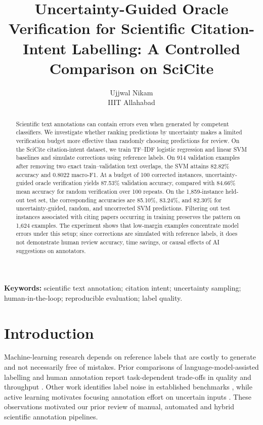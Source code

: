 \documentclass[11pt]{article}
\title{Uncertainty-Guided Oracle Verification for Scientific Citation-Intent Labelling: A Controlled Comparison on SciCite}
\author{Ujjwal Nikam\\IIIT Allahabad}
\date{}
\begin{document}
\maketitle
\begin{abstract}
Scientific text annotations can contain errors even when generated by competent classifiers. We investigate whether ranking predictions by uncertainty makes a limited verification budget more effective than randomly choosing predictions for review. On the SciCite citation-intent dataset, we train TF--IDF logistic regression and linear SVM baselines and simulate corrections using reference labels. On 914 validation examples after removing two exact train--validation text overlaps, the SVM attains 82.82\% accuracy and 0.8022 macro-F1. At a budget of 100 corrected instances, uncertainty-guided oracle verification yields 87.53\% validation accuracy, compared with 84.66\% mean accuracy for random verification over 100 repeats. On the 1,859-instance held-out test set, the corresponding accuracies are 85.10\%, 83.24\%, and 82.30\% for uncertainty-guided, random, and uncorrected SVM predictions. Filtering out test instances associated with citing papers occurring in training preserves the pattern on 1,624 examples. The experiment shows that low-margin examples concentrate model errors under this setup; since corrections are simulated with reference labels, it does not demonstrate human review accuracy, time savings, or causal effects of AI suggestions on annotators.
\end{abstract}
\noindent\textbf{Keywords:} scientific text annotation; citation intent; uncertainty sampling; human-in-the-loop; reproducible evaluation; label quality.

\section{Introduction}
Machine-learning research depends on reference labels that are costly to generate and not necessarily free of mistakes. Prior comparisons of language-model-assisted labelling and human annotation report task-dependent trade-offs in quality and throughput \cite{gilardi2023chatgpt,turner2025large,chen2025human}. Other work identifies label noise in established benchmarks \cite{northcutt2021pervasive}, while active learning motivates focusing annotation effort on uncertain inputs \cite{settles2009active}. These observations motivated our prior review of manual, automated and hybrid scientific annotation pipelines.
\end{document}
